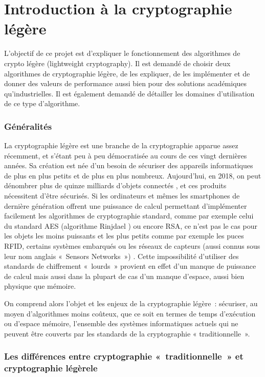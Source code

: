 \newpage
\part{Introduction à la cryptographie légère}

		L'objectif de ce projet est d'expliquer le fonctionnement des algorithmes de crypto légère (lightweight cryptography).
	Il est demandé de choisir deux algorithmes de cryptographie légère, de les expliquer,
	de les implémenter et de donner des valeurs de performance aussi bien pour des solutions académiques qu'industrielles.
	Il est également demandé de détailler les domaines d'utilisation de ce type d'algorithme.

	\section{Généralités}

			La cryptographie légère est une branche de la cryptographie apparue assez
		récemment, et s’étant peu à peu démocratisée au cours de ces vingt
		dernières années. Sa création est née d’un besoin de sécuriser des
		appareils informatiques de plus en plus petits et de plus en plus
		nombreux. Aujourd’hui, en 2018, on peut dénombrer  plus de  quinze
		milliards d’objets connectés \cite{renaud_developpement_2017}, et ces
		produits nécessitent d’être sécurisés. Si les ordinateurs et mêmes les
		smartphones de dernière génération offrent une puissance de calcul
		permettant d’implémenter facilement les algorithmes de cryptographie
		standard, comme par exemple celui du standard AES (algorithme Rinjdael
		\cite{AES-FIPS}) ou encore RSA, ce n’est pas le cas pour les objets les
		moins puissants et les plus petits comme par exemple les puces RFID,
		certains systèmes embarqués ou les réseaux de capteurs (aussi connus sous
		leur nom anglais « Sensors Networks ») \cite{Report_light}. Cette
		impossibilité d’utiliser des standards de chiffrement « lourds » provient
		en effet d’un manque de puissance de calcul mais aussi dans la plupart de
		cas d’un manque d’espace, aussi bien physique que mémoire.

			On comprend alors l’objet et les enjeux de la cryptographie légère :
		sécuriser, au moyen d’algorithmes moins coûteux, que ce soit en termes de
		temps d’exécution ou d’espace mémoire, l’ensemble des systèmes informatiques
		actuels qui ne peuvent être couverts par les standards de la cryptographie «
		traditionnelle ».

	\section{Les différences entre cryptographie « traditionnelle » et cryptographie légèrele}

